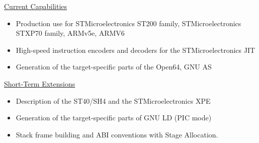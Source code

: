 \documentclass[a4]{seminar}
\begin{document}
\begin{slide}


\begin{center} \underline{Current Capabilities} \end{center}

\begin{itemize}

\item Production use for STMicroelectronics ST200 family, STMicroelectronics
STXP70 family, ARMv5e, ARMV6

\item High-speed instruction encoders and decoders for the STMicroelectronics JIT

\item Generation of the target-specific parts of the Open64, GNU AS

\end{itemize}

\begin{center} \underline{Short-Term Extensions} \end{center}

\begin{itemize}

\item Description of the ST40/SH4 and the STMicroelectronics XPE

\item Generation of the target-specific parts of GNU LD (PIC mode)

\item Stack frame building and ABI conventions with Stage Allocation.

\end{itemize}

\end{slide}
\end{document}
